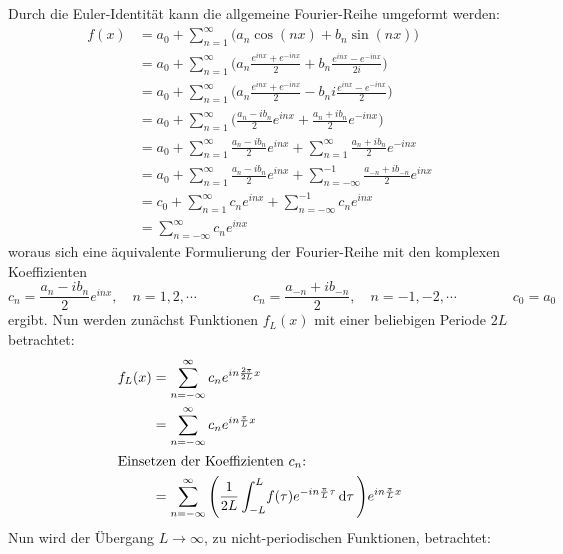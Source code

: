 		Durch die Euler-Identität kann die allgemeine Fourier-Reihe umgeformt werden:
		\begin{align*}
			f(x)
				&= a_0 + \sum_{n = 1}^{\infty} \big( a_n \cos(nx) + b_n \sin(nx) \big) \\
				&= a_0 + \sum_{n = 1}^{\infty} \Bigg( a_n \frac{e^{inx} + e^{-inx}}{2} + b_n \frac{e^{inx} - e^{-inx}}{2i} \Bigg) \\
				&= a_0 + \sum_{n = 1}^{\infty} \Bigg( a_n \frac{e^{inx} + e^{-inx}}{2} - b_n i \frac{e^{inx} - e^{-inx}}{2} \Bigg) \\
				&= a_0 + \sum_{n = 1}^{\infty} \Bigg( \frac{a_n - ib_n}{2} e^{inx} + \frac{a_n + ib_n}{2} e^{-inx} \Bigg) \\
				&= a_0 + \sum_{n = 1}^{\infty} \frac{a_n - ib_n}{2} e^{inx} + \sum_{n = 1}^{\infty} \frac{a_n + ib_n}{2} e^{-inx} \\
				&= a_0 + \sum_{n = 1}^{\infty} \frac{a_n - ib_n}{2} e^{inx} + \sum_{n = -\infty}^{-1} \frac{a_{-n} + ib_{-n}}{2} e^{inx} \\
				&= c_0 + \sum_{n = 1}^{\infty} c_n e^{inx} + \sum_{n = -\infty}^{-1} c_n e^{inx} \\
				&= \sum_{n = -\infty}^{\infty} c_n e^{inx}
		\end{align*}
		woraus sich eine äquivalente Formulierung der Fourier-Reihe mit den komplexen Koeffizienten
		\begin{equation*}
			c_n = \frac{a_n - ib_n}{2} e^{inx}, \quad n = 1, 2, \cdots \quad\quad\quad\quad c_n = \frac{a_{-n} + ib_{-n}}{2}, \quad n = -1, -2, \cdots \quad\quad\quad\quad c_0 = a_0
		\end{equation*}
		ergibt. Nun werden zunächst Funktionen \( f_L(x) \) mit einer beliebigen Periode \( 2L \) betrachtet:
		\begin{align*}
			f_L(x) &= \sum_{n = -\infty}^{\infty} c_n e^{in \frac{2\pi}{2L} x} \\
				 &= \sum_{n = -\infty}^{\infty} c_n e^{in \frac{\pi}{L} x} \\
			\intertext{Einsetzen der Koeffizienten \(c_n\):}
				&= \sum_{n = -\infty}^{\infty} \Bigg( \frac{1}{2L} \int_{-L}^{L} \! f(\tau) e^{-in \frac{\pi}{L} \tau} \dd{\tau} \Bigg) e^{in \frac{\pi}{L} x}
		\end{align*}
		Nun wird der Übergang \( L \to \infty \), \dh zu nicht-periodischen Funktionen, betrachtet:
